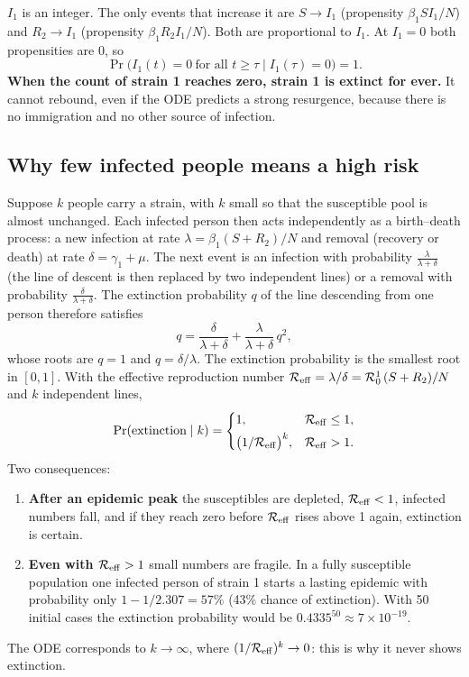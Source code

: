 \documentclass[11pt,a4paper]{article}
\newcommand{\hl}[1]{{\bfseries\color{aimsred}#1}}
\newcommand{\R}{\mathcal R_0}
\begin{document}
$I_1$ is an integer. The only events that increase it are $S\to I_1$ (propensity $\beta_1SI_1/N$) and $R_2\to I_1$ (propensity $\beta_1R_2I_1/N$). Both are proportional to $I_1$. At $I_1=0$ both propensities are 0, so
\[
\Pr\big(I_1(t)=0\ \text{for all }t\ge\tau\mid I_1(\tau)=0\big)=1 .
\]
\hl{When the count of strain 1 reaches zero, strain 1 is extinct for ever.} It cannot rebound, even if the ODE predicts a strong resurgence, because there is no immigration and no other source of infection.

\subsection{Why few infected people means a high risk}

Suppose $k$ people carry a strain, with $k$ small so that the susceptible pool is almost unchanged. Each infected person then acts independently as a birth--death process: a new infection at rate $\lambda=\beta_1(S+R_2)/N$ and removal (recovery or death) at rate $\delta=\gamma_1+\mu$. The next event is an infection with probability $\frac{\lambda}{\lambda+\delta}$ (the line of descent is then replaced by two independent lines) or a removal with probability $\frac{\delta}{\lambda+\delta}$. The extinction probability $q$ of the line descending from one person therefore satisfies
\[
q=\frac{\delta}{\lambda+\delta}+\frac{\lambda}{\lambda+\delta}\,q^2 ,
\]
whose roots are $q=1$ and $q=\delta/\lambda$. The extinction probability is the smallest root in $[0,1]$. With the effective reproduction number $\mathcal R_{\rm eff}=\lambda/\delta=\R^1\,(S+R_2)/N$ and $k$ independent lines,
\[
\Pr(\text{extinction}\mid k)=\begin{cases}1,&\mathcal R_{\rm eff}\le1,\\[3pt]\big(1/\mathcal R_{\rm eff}\big)^k,&\mathcal R_{\rm eff}>1.\end{cases}
\]
Two consequences:
\begin{enumerate}
  \item \textbf{After an epidemic peak} the susceptibles are depleted, $\mathcal R_{\rm eff}<1$, infected numbers fall, and if they reach zero before $\mathcal R_{\rm eff}$ rises above 1 again, extinction is certain.
  \item \textbf{Even with $\mathcal R_{\rm eff}>1$} small numbers are fragile. In a fully susceptible population one infected person of strain 1 starts a lasting epidemic with probability only $1-1/2.307=57\%$ (43\% chance of extinction). With 50 initial cases the extinction probability would be $0.4335^{50}\approx7\times10^{-19}$.
\end{enumerate}
The ODE corresponds to $k\to\infty$, where $(1/\mathcal R_{\rm eff})^k\to0$: this is why it never shows extinction.
\end{document}
